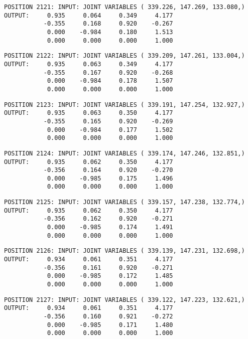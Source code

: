 \begin{verbatim}
POSITION 2121: INPUT: JOINT VARIABLES ( 339.226, 147.269, 133.080,)
OUTPUT:     0.935     0.064     0.349     4.177
           -0.355     0.168     0.920    -0.267
            0.000    -0.984     0.180     1.513
            0.000     0.000     0.000     1.000
\end{verbatim} \pagebreak[1]\begin{verbatim}
POSITION 2122: INPUT: JOINT VARIABLES ( 339.209, 147.261, 133.004,)
OUTPUT:     0.935     0.063     0.349     4.177
           -0.355     0.167     0.920    -0.268
            0.000    -0.984     0.178     1.507
            0.000     0.000     0.000     1.000
\end{verbatim} \pagebreak[1]\begin{verbatim}
POSITION 2123: INPUT: JOINT VARIABLES ( 339.191, 147.254, 132.927,)
OUTPUT:     0.935     0.063     0.350     4.177
           -0.355     0.165     0.920    -0.269
            0.000    -0.984     0.177     1.502
            0.000     0.000     0.000     1.000
\end{verbatim} \pagebreak[1]\begin{verbatim}
POSITION 2124: INPUT: JOINT VARIABLES ( 339.174, 147.246, 132.851,)
OUTPUT:     0.935     0.062     0.350     4.177
           -0.356     0.164     0.920    -0.270
            0.000    -0.985     0.175     1.496
            0.000     0.000     0.000     1.000
\end{verbatim} \pagebreak[1]\begin{verbatim}
POSITION 2125: INPUT: JOINT VARIABLES ( 339.157, 147.238, 132.774,)
OUTPUT:     0.935     0.062     0.350     4.177
           -0.356     0.162     0.920    -0.271
            0.000    -0.985     0.174     1.491
            0.000     0.000     0.000     1.000
\end{verbatim} \pagebreak[1]\begin{verbatim}
POSITION 2126: INPUT: JOINT VARIABLES ( 339.139, 147.231, 132.698,)
OUTPUT:     0.934     0.061     0.351     4.177
           -0.356     0.161     0.920    -0.271
            0.000    -0.985     0.172     1.485
            0.000     0.000     0.000     1.000
\end{verbatim} \pagebreak[1]\begin{verbatim}
POSITION 2127: INPUT: JOINT VARIABLES ( 339.122, 147.223, 132.621,)
OUTPUT:     0.934     0.061     0.351     4.177
           -0.356     0.160     0.921    -0.272
            0.000    -0.985     0.171     1.480
            0.000     0.000     0.000     1.000
\end{verbatim} \pagebreak[1]\begin{verbatim}

\end{verbatim}
